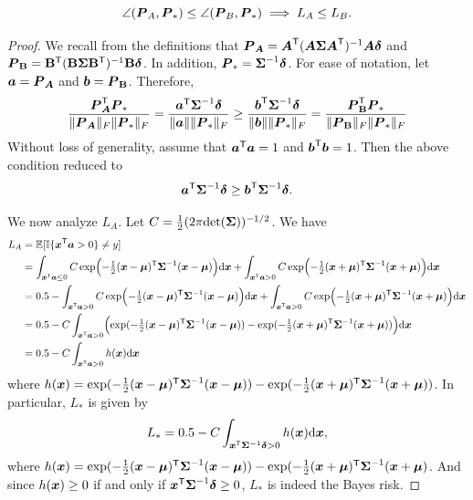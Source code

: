 \documentclass[10pt]{article}
\begin{document}
\begin{lem}
\label{q:a2}
$$\angle(\bP_A,\bP_*) \leq \angle(\bP_B,\bP_*) \implies L_A \leq L_B.$$
\end{lem}
\begin{proof}
We recall from the definitions that $\bP_{\bA} = \bA\T (\bA \mb{\Sigma} \bA\T)^{-1} \bA \mb{\delta}$ and $\bP_{\mathbf{B}} = \mathbf{B}\T (\mathbf{B} \mb{\Sigma} \mathbf{B}\T)^{-1} \mathbf{B} \mb{\delta}$. In addition, $\bP_{*} = \mb{\Sigma}^{-1} \mb{\delta}$. For ease of notation, let $\mb{a} = \bP_{\bA}$ and $\mb{b} = \bP_{\mathbf{B}}$. 
Therefore,
$$ 
\frac{\bP_{\bA}\T \bP_{*}}{\|\bP_{\bA}\|_{F} \|\bP_{*}\|_{F}} = \frac{\mb{a}\T \mb{\Sigma}^{-1} \mb{\delta}}{\|\mb{a}\| \|\bP_{*}\|_{F}} \geq  \frac{\mb{b}\T \mb{\Sigma}^{-1} \mb{\delta}}{\|\mb{b}\| \|\bP_{*}\|_{F}} = \frac{\bP_{\mathbf{B}}\T \bP_{*}}{\|\bP_{\mathbf{B}}\|_{F} \|\bP_{*}\|_{F}}
$$
Without loss of generality, assume that $\mb{a}\T \mb{a} = 1$ and  $\mb{b}\T \mb{b} = 1$. Then the above condition reduced to
$$ \mb{a}\T \mb{\Sigma}^{-1} \mb{\delta} \geq \mb{b}\T \mb{\Sigma}^{-1} \mb{\delta}.$$

We now analyze $L_{A}$. Let $C = \tfrac{1}{2}(2 \pi \mathrm{\det}(\mb{\Sigma}))^{-1/2}$. We have
\begin{equation*}
\begin{split}
L_{A} &= \mathbb{E}[\mathbb{I}\{\mb{x}\T \mb{a} > 0\} \not = y] \\ &=
\int_{\mb{x}\T \mb{a} \leq 0} C \exp\Bigl(-\tfrac{1}{2}(\mb{x} - \mb{\mu})\T \mb{\Sigma}^{-1} (\mb{x} - \mb{\mu})\Bigr) \mathrm{d} \mb{x} + \int_{\mb{x}\T \mb{a} > 0} C \exp\Bigl(-\tfrac{1}{2}(\mb{x} + \mb{\mu})\T \mb{\Sigma}^{-1} (\mb{x} + \mb{\mu})\Bigr) \mathrm{d} \mb{x}
\\ &= 0.5 - 
\int_{\mb{x}\T \mb{a} > 0} C \exp\Bigl(-\tfrac{1}{2}(\mb{x} - \mb{\mu})\T \mb{\Sigma}^{-1} (\mb{x} - \mb{\mu})\Bigr) \mathrm{d} \mb{x}
+ \int_{\mb{x}\T \mb{a} > 0} C \exp\Bigl(-\tfrac{1}{2}(\mb{x} + \mb{\mu})\T \mb{\Sigma}^{-1} (\mb{x} + \mb{\mu})\Bigr) \mathrm{d} \mb{x}
\\ &= 0.5 - C \int_{\mb{x}\T \mb{a} > 0} \Bigl(\exp(-\tfrac{1}{2}(\mb{x} - \mb{\mu})\T \mb{\Sigma}^{-1} (\mb{x} - \mb{\mu})) - \exp(-\tfrac{1}{2}(\mb{x} + \mb{\mu})\T \mb{\Sigma}^{-1} (\mb{x} + \mb{\mu})) \Bigr) \mathrm{d} \mb{x}
\\ &= 0.5 - C \int_{\mb{x}\T \mb{a} > 0} h(\mb{x}) \mathrm{d} \mb{x}
\end{split}
\end{equation*}
where $h(\mb{x}) = \exp(-\tfrac{1}{2}(\mb{x} - \mb{\mu})\T \mb{\Sigma}^{-1} (\mb{x} - \mb{\mu})) - \exp(-\tfrac{1}{2}(\mb{x} + \mb{\mu})\T \mb{\Sigma}^{-1} (\mb{x} + \mb{\mu}))$.
In particular, $L_*$ is given by
$$L_* = 0.5 - C \int_{\mb{x}\T \mb{\Sigma}^{-1} \mb{\delta} > 0} h(\mb{x}) \mathrm{d} \mb{x}, $$
where $h(\mb{x}) = \exp(-\tfrac{1}{2}(\mb{x} - \mb{\mu})\T \mb{\Sigma}^{-1} (\mb{x} - \mb{\mu})) - \exp(-\tfrac{1}{2}(\mb{x} + \mb{\mu})\T \mb{\Sigma}^{-1} (\mb{x} + \mb{\mu})$. 
And since  $h(\mb{x}) \geq 0$ if and only if $\mb{x}\T \mb{\Sigma}^{-1} \mb{\delta} \geq 0$, $L_*$ is indeed the Bayes risk. 


\end{proof}
\end{document}
